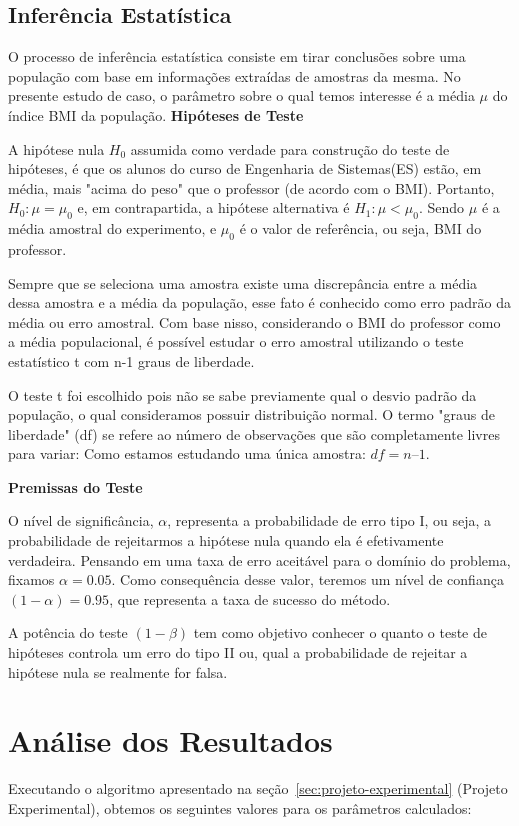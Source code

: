 \documentclass[12pt, a4paper]{article}
\begin{document}
\subsection{Inferência Estatística}
O processo de inferência estatística consiste em tirar conclusões sobre uma população com base em informações extraídas de amostras da mesma. No presente estudo de caso, o parâmetro sobre o qual temos interesse é a média $\mu$ do índice BMI da população.
\newline
\textbf{Hipóteses de Teste}
\par A hipótese nula $H_{0}$ assumida como verdade para construção do teste de hipóteses, é que os alunos do curso de Engenharia de Sistemas(ES) estão, em média, mais "acima do peso" que o professor (de acordo com o BMI). Portanto, $H_{0}: \mu = \mu_{0}$ e, em contrapartida, a hipótese alternativa é $H_{1}: \mu < \mu_{0}$. Sendo $\mu$ é a média amostral do experimento, e $\mu_{0}$ é o valor de referência, ou seja, BMI do professor.
\par Sempre que se seleciona uma amostra existe uma discrepância entre a média dessa amostra e a média da população, esse fato é conhecido como erro padrão da média ou erro amostral. Com base nisso, considerando o BMI do professor como a média populacional, é possível estudar o erro amostral utilizando o teste estatístico t com n-1 graus de liberdade.
\par O teste t foi escolhido pois não se sabe previamente qual o desvio padrão da população, o qual consideramos possuir distribuição normal. O termo "graus de liberdade" (df) se refere ao número de observações que são completamente livres para variar: Como estamos estudando uma única amostra: $df = n – 1$.

\textbf{Premissas do Teste}
\par O nível de significância, $\alpha$, representa a probabilidade de erro tipo I, ou seja, a probabilidade de rejeitarmos a hipótese nula quando ela é efetivamente verdadeira. Pensando em uma taxa de erro aceitável para o domínio do problema, fixamos $\alpha = 0.05$. Como consequência desse valor, teremos um nível de confiança $(1 - \alpha) = 0.95$, que representa a taxa de sucesso do método.
\par A potência do teste $(1 - \beta)$ tem como objetivo conhecer o quanto o teste de hipóteses controla um erro do tipo II ou, qual a probabilidade de rejeitar a hipótese nula se realmente for falsa.

\section{Análise dos Resultados}
Executando o algoritmo apresentado na seção~\ref{sec:projeto-experimental} (Projeto Experimental), obtemos os seguintes valores para os parâmetros calculados:
\end{document}
